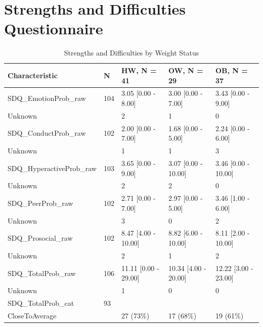\documentclass[
]{article}
\begin{document}
\FloatBarrier

\FloatBarrier

\clearpage

\hypertarget{strengths-and-difficulties-questionnaire}{%
\section{Strengths and Difficulties
Questionnaire}\label{strengths-and-difficulties-questionnaire}}

\begin{table}[!h]

\caption{\label{tab:SDQ_OB_tab}Strengths and Difficulties by Weight Status}
\centering
\begin{tabular}[t]{lllll}
\toprule
Characteristic & N & HW, N = 41 & OW, N = 29 & OB, N = 37\\
\midrule
SDQ\_EmotionProb\_raw & 104 & 3.05 [0.00 - 8.00] & 3.00 [0.00 - 7.00] & 3.43 [0.00 - 9.00]\\
\hspace{1em}Unknown &  & 2 & 1 & \vphantom{1} 0\\
SDQ\_ConductProb\_raw & 102 & 2.00 [0.00 - 7.00] & 1.68 [0.00 - 5.00] & 2.24 [0.00 - 6.00]\\
\hspace{1em}Unknown &  & 1 & 1 & \vphantom{1} 3\\
SDQ\_HyperactiveProb\_raw & 103 & 3.65 [0.00 - 9.00] & 3.07 [0.00 - 10.00] & 3.46 [0.00 - 10.00]\\
\addlinespace
\hspace{1em}Unknown &  & 2 & 2 & \vphantom{1} 0\\
SDQ\_PeerProb\_raw & 102 & 2.71 [0.00 - 7.00] & 2.97 [0.00 - 5.00] & 3.46 [1.00 - 6.00]\\
\hspace{1em}Unknown &  & 3 & 0 & \vphantom{1} 2\\
SDQ\_Prosocial\_raw & 102 & 8.47 [4.00 - 10.00] & 8.82 [6.00 - 10.00] & 8.11 [2.00 - 10.00]\\
\hspace{1em}Unknown &  & 2 & 1 & \vphantom{1} 2\\
\addlinespace
SDQ\_TotalProb\_raw & 106 & 11.11 [0.00 - 29.00] & 10.34 [4.00 - 20.00] & 12.22 [3.00 - 23.00]\\
\hspace{1em}Unknown &  & 1 & 0 & 0\\
SDQ\_TotalProb\_cat & 93 &  &  & \\
\hspace{1em}CloseToAverage &  & 27 (73\%) & 17 (68\%) & 19 (61\%)\\

\end{tabular}
\end{table}
\end{document}
